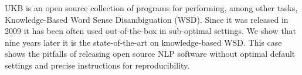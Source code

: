 UKB is an open source collection of programs for performing, among other tasks, Knowledge-Based Word Sense Disambiguation (WSD). Since it was released in 2009 it has been often used out-of-the-box in sub-optimal settings. We show that nine years later it is the state-of-the-art on knowledge-based WSD. This case shows the pitfalls of releasing open source NLP software without optimal default settings and precise instructions for reproducibility.
